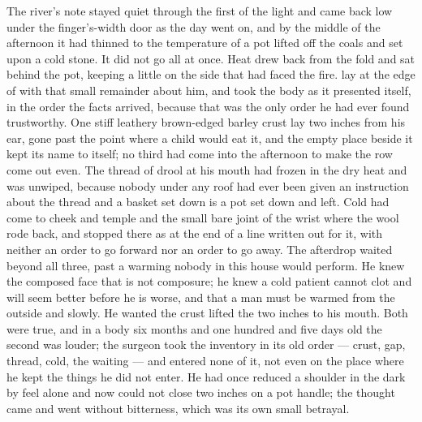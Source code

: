 The river's note stayed quiet through the first of the light and came back low under the finger's-width door as the day went on, and by the middle of the afternoon it had thinned to the temperature of a pot lifted off the coals and set upon a cold stone. It did not go all at once. Heat drew back from the fold and sat behind the pot, keeping a little on the side that had faced the fire.  lay at the edge of  with that small remainder about him, and took the body as it presented itself, in the order the facts arrived, because that was the only order he had ever found trustworthy. One stiff leathery brown-edged barley crust lay two inches from his ear, gone past the point where a child would eat it, and the empty place beside it kept its name to itself; no third had come into the afternoon to make the row come out even. The thread of drool at his mouth had frozen in the dry heat and was unwiped, because nobody under any roof had ever been given an instruction about the thread and a basket set down is a pot set down and left. Cold had come to cheek and temple and the small bare joint of the wrist where the wool rode back, and stopped there as at the end of a line written out for it, with neither an order to go forward nor an order to go away. The afterdrop waited beyond all three, past a warming nobody in this house would perform. He knew the composed face that is not composure; he knew a cold patient cannot clot and will seem better before he is worse, and that a man must be warmed from the outside and slowly. He wanted the crust lifted the two inches to his mouth. Both were true, and in a body six months and one hundred and five days old the second was louder; the surgeon took the inventory in its old order --- crust, gap, thread, cold, the waiting --- and entered none of it, not even on the place where he kept the things he did not enter. He had once reduced a shoulder in the dark by feel alone and now could not close two inches on a pot handle; the thought came and went without bitterness, which was its own small betrayal.

